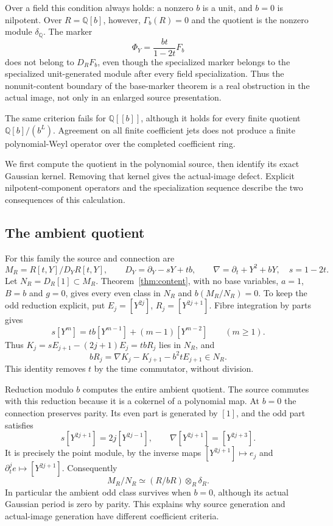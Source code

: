\documentclass[11pt]{article}
\theoremstyle{definition}\newtheorem{definition}[theorem]{Definition}
\theoremstyle{remark}\newtheorem{remark}[theorem]{Remark}
\begin{document}
Over a field this condition always holds: a nonzero $b$ is a unit,
and $b=0$ is nilpotent. Over $R=\mathbb Q[b]$, however,
$\Gamma_b(R)=0$ and the quotient is the nonzero module
$\delta_{\mathbb Q}$. The marker
\[
 \Phi_Y=\frac{bt}{1-2t}F_b
\]
does not belong to $D_RF_b$, even though the specialized marker belongs to the specialized unit-generated
module after every field specialization. Thus the nonunit-content boundary of the
base-marker theorem is a real obstruction in the actual image,
not only in an enlarged source presentation.

The same criterion fails for $\mathbb Q[[b]]$, although it holds
for every finite quotient $\mathbb Q[b]/(b^L)$. Agreement on all
finite coefficient jets does not produce a finite polynomial-Weyl
operator over the completed coefficient ring.

We first compute the quotient in the polynomial source, then identify
its exact Gaussian kernel. Removing that kernel gives the actual-image
defect. Explicit nilpotent-component operators and the specialization
sequence describe the two consequences of this calculation.

\subsection{The ambient quotient}

For this family the source and connection are
\[
 M_R=R[t,Y]/D_YR[t,Y],\qquad
 D_Y=\partial_Y-sY+tb,\qquad
 \nabla=\partial_t+Y^2+bY,\quad s=1-2t.
\]
Let $N_R=D_R[1]\subset M_R$. Theorem~\ref{thm:content}, with
no base variables, $a=1$, $B=b$ and $g=0$, gives every even
class in $N_R$ and $b(M_R/N_R)=0$. To keep the odd reduction
explicit, put $E_j=[Y^{2j}]$, $R_j=[Y^{2j+1}]$. Fibre integration
by parts gives
\begin{equation}\label{eq:wickrec}
 s[Y^m]=tb[Y^{m-1}]+(m-1)[Y^{m-2}]\qquad(m\ge1).
\end{equation}
Thus $K_j=sE_{j+1}-(2j+1)E_j=tbR_j$ lies in $N_R$, and
\begin{equation}\label{eq:content}
 bR_j=\nabla K_j-K_{j+1}-b^2tE_{j+1}\in N_R.
\end{equation}
This identity removes $t$ by the time commutator, without division.

Reduction modulo $b$ computes the entire ambient quotient.
The source commutes with this reduction because it is a cokernel
of a polynomial map. At $b=0$ the connection preserves parity.
Its even part is generated by $[1]$, and the odd part satisfies
\[
 s[Y^{2j+1}]=2j[Y^{2j-1}],\qquad
 \nabla[Y^{2j+1}]=[Y^{2j+3}].
\]
It is precisely the point module, by the inverse maps
$[Y^{2j+1}]\mapsto e_j$ and $\partial_t^je\mapsto[Y^{2j+1}]$.
Consequently
\begin{equation}\label{eq:ambientdefect}
 M_R/N_R\simeq(R/bR)\otimes_R\delta_R.
\end{equation}
In particular the ambient odd class survives when $b=0$, although
its actual Gaussian period is zero by parity. This explains why
source generation and actual-image generation have different
coefficient criteria.
\end{document}
